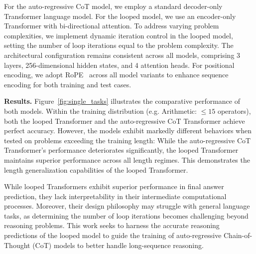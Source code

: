

For the auto-regressive CoT model, we employ a standard decoder-only Transformer language model. For the looped model, we use an encoder-only Transformer with bi-directional attention. To address varying problem complexities, we implement dynamic iteration control in the looped model, setting the number of loop iterations equal to the problem complexity. The architectural configuration remains consistent across all models, comprising 3 layers, 256-dimensional hidden states, and 4 attention heads. For positional encoding, we adopt RoPE~\cite{su2024rope} across all model variants to enhance sequence encoding for both training and test cases.

\textbf{Results.}
Figure~\ref{fig:single_tasks} illustrates the comparative performance of both models. Within the training distribution (e.g. Arithmetic: $\leq15$ operators), both the looped Transformer and the auto-regressive CoT Transformer achieve perfect accuracy. However, the models exhibit markedly different behaviors when tested on problems exceeding the training length: While the auto-regressive CoT Transformer's performance deteriorates significantly, the looped Transformer maintains superior performance across all length regimes. This demonstrates the length generalization capabilities of the looped Transformer.

While looped Transformers exhibit superior performance in final answer prediction, they lack interpretability in their intermediate computational processes. Moreover, their design philosophy may struggle with general language tasks, as determining the number of loop iterations becomes challenging beyond reasoning problems. This work seeks to harness the accurate reasoning predictions of the looped model to guide the training of auto-regressive Chain-of-Thought (CoT) models to better handle long-sequence reasoning.

